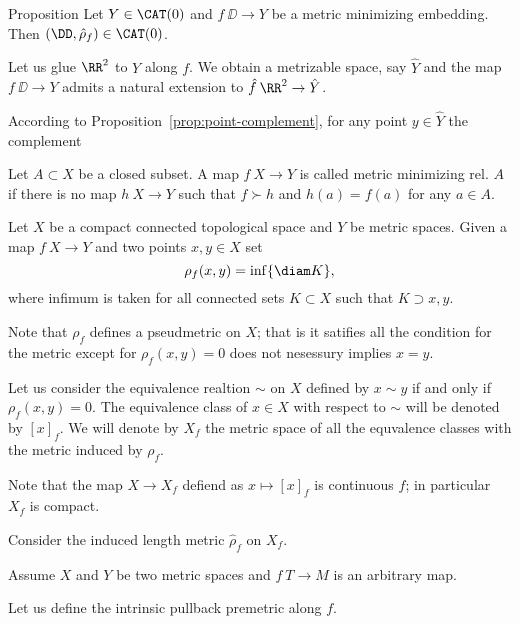 
















\begin{thm}{Proposition}
Let $Y\in\CAT(0)$ 
and 
$f\:\DD\to Y$ be a metric minimizing embedding.
Then $(\DD,\hat\rho_f)\in \CAT(0)$.
\end{thm}



Let us glue $\RR^2$ to $Y$ along $f$.
We obtain a metrizable space, say $\hat Y$
and the map $f\:\DD\to Y$ admits a natural extension to $\hat f\:\RR^2\to \hat Y$.

According to Proposition~\ref{prop:point-complement}, for any point $y\in \hat Y$ the complement 








Let $A\subset X$ be a closed subset.
A map $f\:X\to Y$ is called metric minimizing rel. $A$
if there is no map $h\:X\to Y$ such that $f\succ h$ and $h(a)=f(a)$ for any $a\in A$.


Let $X$ be a compact connected topological space
and $Y$ be metric spaces.
Given a map $f\:X\to Y$ and two points $x,y\in X$
set 
\[\rho_f(x,y)=\inf\{\diam K\},\]
where infimum is taken for all connected sets $K\subset X$
such that $K\supset x,y$.

Note that $\rho_f$ defines a pseudmetric on $X$;
that is it satifies all the condition for the metric except for $\rho_f(x,y)=0$ does not nesessury implies $x=y$.


Let us consider the equivalence realtion $\sim$ on $X$ 
defined by
$x\sim y$ if and only if $\rho_f(x,y)=0$.
The equivalence class of $x\in X$ with respect to $\sim$
will be denoted by $[x]_f$.
We will denote by $X_f$ 
the metric space of all the equvalence classes with the metric induced by $\rho_f$.

Note that the map $X\to X_f$ defiend as $x\mapsto [x]_f$
is continuous $f$;
in particular $X_f$ is compact.

Consider the induced length metric $\hat\rho_f$ on $X_f$.


Assume $X$ and $Y$ be two metric spaces 
and $f\:T\to M$ is an arbitrary map.

Let us define the intrinsic pullback premetric along $f$.

